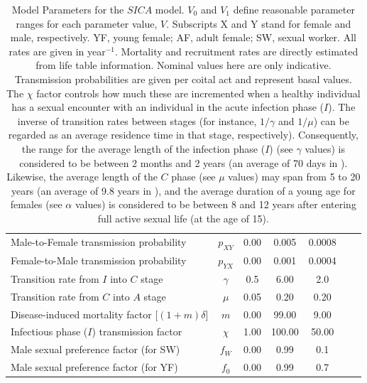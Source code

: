 \documentclass[preprint,12pt]{elsarticle}
\begin{document}
\begin{table}
\begin{tabular}{p{7.0cm}cccccc}
{\small Male-to-Female transmission probability}           & $p_{XY}$    & 0.00 & 0.005   & 0.0008 & \cite{Patel2014,Wawer2005,Gray2001}\\
{\small Female-to-Male transmission probability}           & $p_{YX}$    & 0.00 & 0.001   & 0.0004 & \cite{Patel2014,Wawer2005,Gray2001} \\  
{\small Transition rate from $I$ into $C$ stage}           & $\gamma$    & 0.5  & 6.00    & 2.0 
& \cite{Fiebig2003}\\
{\small Transition rate from $C$ into $A$ stage}           & $\mu$       & 0.05 & 0.20    & 0.20 
& \cite{Bacchetti1989}\\
{\small Disease-induced mortality factor [$(1+m)\delta$}]   & $m$         & 0.00 & 99.00   & 9.00 &\\ 
{\small Infectious phase ($I$) transmission factor}        & $\chi$      & 1.00 & 100.00   & 50.00 
&\cite{Pinkerton2008}\\
{\small Male sexual preference factor (for SW)}            & $f_W$       & 0.00 & 0.99    & 0.1
&\\
{\small Male sexual preference factor (for YF)}            & $f_0$       & 0.00 & 0.99    & 0.7
&\\
\hline\hline
\end{tabular}
\caption{Model Parameters for the $SICA$ model. $V_0$ and $V_1$ define reasonable parameter ranges for each parameter value, $V$. Subscripts X and Y stand for female and male, respectively. YF, young female; AF, adult female; SW, sexual worker. All rates are given in year$^{-1}$. Mortality and recruitment rates are directly estimated from life table information. Nominal values here are only indicative. Transmission probabilities are given per coital act and represent basal values. The $\chi$ factor controls how much these are incremented when a healthy individual has a sexual encounter with an individual in the acute infection phase ($I$). The inverse of transition rates between stages (for instance, $1/\gamma$ and $1/\mu$) can be regarded as an average residence time in that stage, respectively). Consequently, the range for the average length of the infection phase ($I$) (see $\gamma$ values) is considered to be between 2 months and 2 years (an average of 70 days in \cite{Fiebig2003}). Likewise, the average length of the $C$ phase (see $\mu$ values) may span from 5 to 20 years (an average of 9.8 years in \cite{Bacchetti1989}), and the average duration of a young age for females (see $\alpha$ values) is considered to be between 8 and 12 years after entering full active sexual life (at the age of 15).}
\label{T1:Parameter_Values}
\end{table}
\end{document}
